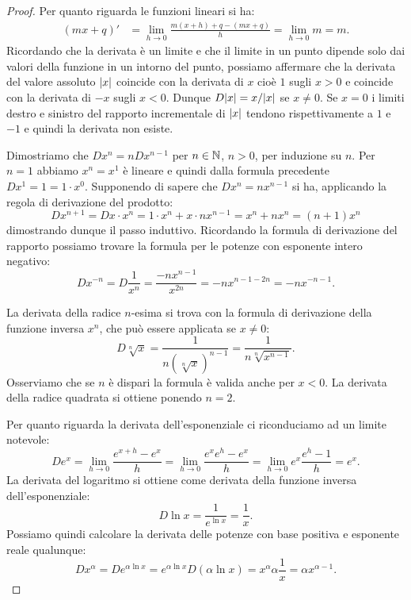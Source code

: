 \begin{proof}
\mymark{**}
Per quanto riguarda le funzioni lineari si ha:
\begin{align*}
(mx+q)' &= \lim_{h\to 0}\frac{m(x+h)+q - (mx+q)}{h} = \lim_{h\to 0} m = m.
\end{align*}
Ricordando che la derivata è un limite e che il limite in un punto dipende solo dai valori della funzione in un intorno del punto, possiamo affermare che la derivata del valore assoluto ${\left|x\right|}$ coincide con la derivata di $x$ cioè $1$ sugli $x>0$ e coincide con la derivata di $-x$ sugli $x<0$. Dunque $D {\left|x\right|} = x / {\left|x\right|}$ se $x\neq 0$. Se $x=0$ i limiti destro e sinistro del rapporto incrementale di ${\left|x\right|}$ tendono rispettivamente a $1$ e $-1$ e quindi la derivata non esiste.

Dimostriamo che $Dx^n = n D x^{n-1}$ per $n\in \mathbb N$, $n>0$, per induzione su $n$. Per $n=1$ abbiamo $x^n=x^1$ è lineare e quindi dalla formula precedente $Dx^1 = 1 = 1 \cdot x^0$. Supponendo di sapere che $D x^n = n x^{n-1}$ si ha, applicando la regola di derivazione del prodotto:
\[
  D x^{n+1} = D x\cdot x^n = 1 \cdot x^n + x \cdot n x^{n-1}
   = x^n + n x^n = (n+1) x^n
\]
dimostrando dunque il passo induttivo.
Ricordando la formula di derivazione del rapporto
possiamo trovare la formula per le potenze con esponente intero negativo:
\[
  D x^{-n} = D \frac{1}{x^n} = \frac{-n x^{n-1}}{x^{2n}}
   = -n x^{n-1-2n} = -n x^{-n-1}.
\]

La derivata della radice $n$-esima si trova con la formula di derivazione della funzione inversa $x^n$, che può essere applicata se $x\neq 0$:
\[
  D \sqrt[n]{x} = \frac{1}{n(\sqrt[n]{x})^{n-1}}
    = \frac{1}{n\sqrt[n]{x^{n-1}}}.
\]
Osserviamo che se $n$ è dispari la formula è valida anche per $x<0$.
La derivata della radice quadrata si ottiene ponendo $n=2$.

Per quanto riguarda la derivata dell'esponenziale
ci riconduciamo ad un limite notevole:
\[
  D e^x = \lim_{h\to 0} \frac{e^{x+h}-e^x}{h}
  = \lim_{h\to 0}\frac{e^x e^h - e^x}{h}
  = \lim_{h\to 0}e^x \frac{e^h - 1}{h}
  = e^x.
\]
La derivata del logaritmo si ottiene come derivata della funzione inversa dell'esponenziale:
\[
  D \ln x = \frac{1}{e^{\ln x}} = \frac{1}{x}.
\]
Possiamo quindi calcolare la derivata delle potenze con base positiva e esponente reale qualunque:
\[
D x^\alpha
= D e^{\alpha \ln x}
= e^{\alpha \ln x} D(\alpha \ln x)
= x^\alpha \alpha \frac{1}{x}
= \alpha x^{\alpha -1}.
\]


\end{proof}
